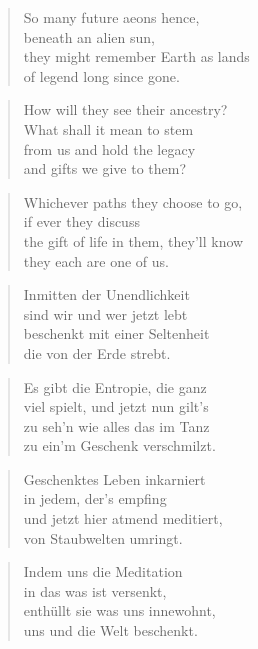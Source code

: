 \documentclass[10pt,a4paper]{article}
\begin{document}
\begin{paracol}{2}
\begin{verse}
So many future aeons hence,\\
beneath an alien sun,\\
they might remember Earth as lands\\
of legend long since gone.
\end{verse}

\begin{verse}
How will they see their ancestry?\\
What shall it mean to stem\\
from us and hold the legacy\\
and gifts we give to them?
\end{verse}

\begin{verse}
Whichever paths they choose to go,\\
if ever they discuss\\
the gift of life in them, they’ll know\\
they each are one of us.
\end{verse}

\switchcolumn



\begin{verse}
Inmitten der Unendlichkeit \\
sind wir und wer jetzt lebt \\
beschenkt mit einer Seltenheit \\
die von der Erde strebt. \\
\end{verse}

\begin{verse}
Es gibt die Entropie, die ganz \\
viel spielt, und jetzt nun gilt’s \\
zu seh’n wie alles das im Tanz \\
zu ein’m Geschenk verschmilzt. \\
\end{verse}

\begin{verse}
Geschenktes Leben inkarniert \\
in jedem, der’s empfing \\
und jetzt hier atmend meditiert, \\
von Staubwelten umringt. \\
\end{verse}

\begin{verse}
Indem uns die Meditation \\
in das was ist versenkt, \\
enthüllt sie was uns innewohnt, \\
uns und die Welt beschenkt. \\
\end{verse}


\end{paracol}
\end{document}
